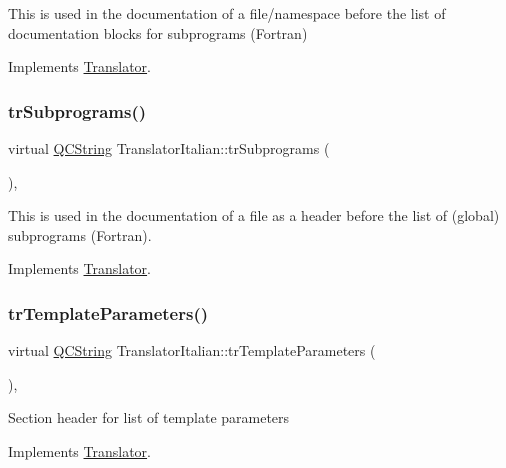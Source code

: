 This is used in the documentation of a file/namespace before the list of documentation blocks for subprograms (Fortran) 

Implements \mbox{\hyperlink{class_translator}{Translator}}.

\mbox{\label{class_translator_italian_a209a6eba3a7a896e7848fea453ec84a8}} 
\subsubsection{\texorpdfstring{trSubprograms()}{trSubprograms()}}
{\footnotesize\ttfamily virtual \mbox{\hyperlink{class_q_c_string}{Q\+C\+String}} Translator\+Italian\+::tr\+Subprograms (\begin{DoxyParamCaption}{ }\end{DoxyParamCaption})\hspace{0.3cm}{\ttfamily [inline]}, {\ttfamily [virtual]}}

This is used in the documentation of a file as a header before the list of (global) subprograms (Fortran). 

Implements \mbox{\hyperlink{class_translator}{Translator}}.

\mbox{\label{class_translator_italian_a9cb99a813d2e67651e723be6065e3190}} 
\subsubsection{\texorpdfstring{trTemplateParameters()}{trTemplateParameters()}}
{\footnotesize\ttfamily virtual \mbox{\hyperlink{class_q_c_string}{Q\+C\+String}} Translator\+Italian\+::tr\+Template\+Parameters (\begin{DoxyParamCaption}{ }\end{DoxyParamCaption})\hspace{0.3cm}{\ttfamily [inline]}, {\ttfamily [virtual]}}

Section header for list of template parameters 

Implements \mbox{\hyperlink{class_translator}{Translator}}.

\mbox{\label{class_translator_italian_a48ede639c7999aefde7f2c8795b0c4ee}} 

